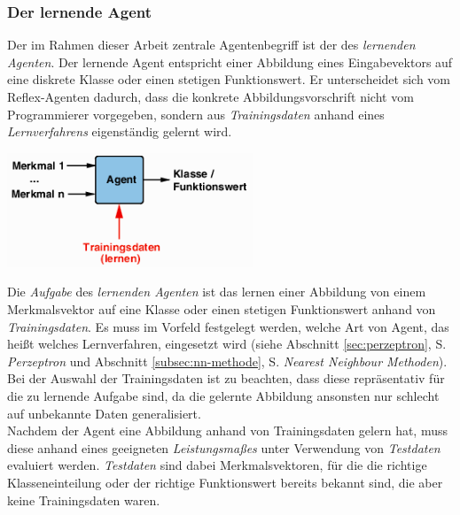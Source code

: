 \documentclass[fontsize=11pt]{scrartcl}
\newenvironment{Figure}
  {\par\medskip\noindent\minipage{\linewidth}}
  {\endminipage\par\medskip}
\newcommand*{\quelle}{%
  \footnotesize Quelle: 
}
\begin{document}
            \subsubsection{Der lernende Agent}
            \label{subsec:lernenderagent}
                Der im Rahmen dieser Arbeit zentrale Agentenbegriff ist der des \emph{lernenden Agenten}. Der lernende Agent entspricht einer Abbildung eines Eingabevektors auf eine diskrete Klasse oder einen stetigen Funktionswert. Er unterscheidet sich vom Reflex-Agenten dadurch, dass die konkrete Abbildungsvorschrift nicht vom Programmierer vorgegeben, sondern aus \emph{Trainingsdaten} anhand eines \emph{Lernverfahrens} eigenständig gelernt wird\cite{ertel2016}.
                \begin{Figure}
                   \centering
                   \includegraphics[scale=1]{lernenderagent.png}
                   \raggedleft\footnotesize\cite[S.194, Abb. 8.4(rechts)]{ertel2016}
                \end{Figure}
                Die \emph{Aufgabe} des \emph{lernenden Agenten} ist das lernen einer Abbildung von einem Merkmalsvektor auf eine Klasse oder einen stetigen Funktionswert anhand von \emph{Trainingsdaten}. Es muss im Vorfeld festgelegt werden, welche Art von Agent, das heißt welches Lernverfahren, eingesetzt wird (siehe Abschnitt \ref{sec:perzeptron}, S. \pageref{sec:perzeptron} \emph{Perzeptron} und Abschnitt \ref{subsec:nn-methode}, S. \pageref{subsec:nn-methode} \emph{Nearest Neighbour Methoden}).
                Bei der Auswahl der Trainingsdaten ist zu beachten, dass diese repräsentativ für die zu lernende Aufgabe sind, da die gelernte Abbildung ansonsten nur schlecht auf unbekannte Daten generalisiert.\\
                Nachdem der Agent eine Abbildung anhand von Trainingsdaten gelern hat, muss diese anhand eines geeigneten \emph{Leistungsmaßes} unter Verwendung von \emph{Testdaten} evaluiert werden. \emph{Testdaten} sind dabei Merkmalsvektoren, für die  die richtige Klasseneinteilung oder der richtige Funktionswert bereits bekannt sind, die aber keine Trainingsdaten waren\cite{ertel2016}.
\end{document}
